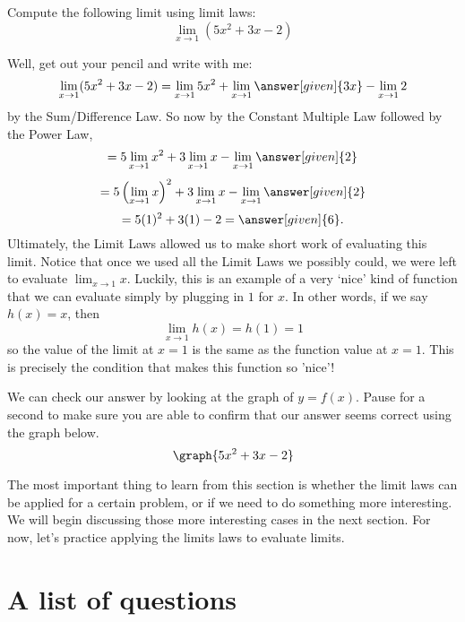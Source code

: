 \documentclass{ximera}
\begin{document}
\begin{example}
  Compute the following limit using limit laws:
  \[
  \displaystyle\lim_{x\to 1}(5x^2+3x-2)
  \]
\begin{explanation}
  Well, get out your pencil and write with me:
  \[
  \displaystyle\lim_{x\to 1} (5x^2+3x-2) = \lim_{x\to 1} 5x^2 + \lim_{x\to 1} \answer[given]{3x} - \lim_{x\to 1}2
  \]
  by the Sum/Difference Law. So now by the Constant Multiple Law followed by the Power Law, 
  \[
  = 5\displaystyle\lim_{x\to 1} x^2 + 3\lim_{x\to 1} x - \lim_{x\to 1}\answer[given]{2}
  \]
   \[
  = 5\left(\displaystyle\lim_{x\to 1} x\right)^2 + 3\lim_{x\to 1} x - \lim_{x\to 1}\answer[given]{2}
  \]
  \[
  = 5(1)^2 + 3(1) - 2 =\answer[given]{6}.
  \]
Ultimately, the Limit Laws allowed us to make short work of evaluating this limit.  Notice that once we used all the Limit Laws we possibly could, we were left to evaluate $\displaystyle\lim_{x\to 1} x$.  Luckily, this is an example of a very `nice' kind of function that we can evaluate simply by plugging in $1$ for $x$.  In other words, if we say $h(x) = x$, then $$\displaystyle\lim_{x\to 1} h(x) = h(1) = 1$$ so the value of the limit at $x=1$ is the same as the function value at $x=1$.  This is precisely the condition that makes this function so 'nice'!  

  \begin{prompt}
    We can check our answer by looking at the graph of $y=f(x)$.  Pause for a second to make sure you are able to confirm that our answer seems correct using the graph below. 
    \[
    \graph{5x^2+3x-2}
    \]
  \end{prompt}
\end{explanation}  
\end{example}


The most important thing to learn from this section is whether the
limit laws can be applied for a certain problem, or if we need to
do something more interesting.  We will begin discussing those more
interesting cases in the next section.  For now, let's practice applying the limits laws to evaluate limits.

\section{A list of questions}
\end{document}
